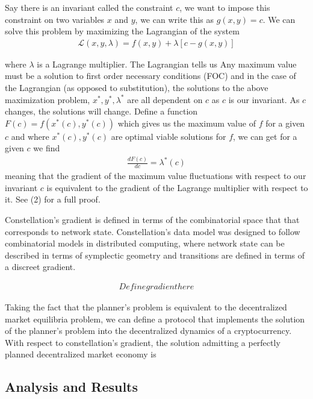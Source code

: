 \documentclass{article}
\begin{document}
Say there is an invariant called the constraint $c$, we want to impose this constraint on two variables $x$ and $y$, we can write this as $g(x, y) = c$. We can solve this problem by maximizing the Lagrangian of the system
\begin{equation} \label{eq1}
\begin{split}
\mathcal{L}(x, y, \lambda) = f(x, y) + \lambda [c - g(x,y)]
\end{split}
\end{equation}

where $\lambda$ is a Lagrange multiplier. The Lagrangian tells us Any maximum value must be a solution to first order necessary conditions (FOC) and in the case of the Lagrangian (as opposed to substitution), the solutions to the above maximization problem, $x^*, y^*, \lambda^*$ are all dependent on $c$ as $c$ is our invariant. As $c$ changes, the solutions will change. Define a function $F(c) = f(x^*(c), y^*(c))$ which gives us the maximum value of $f$ for a given $c$ and where $x^*(c), y^*(c)$ are optimal viable solutions for $f$, we can get for a given $c$ we find
\begin{equation} \label{eq1}
\begin{split}
\frac{dF(c)}{dc} = \lambda^*(c) 
\end{split}
\end{equation}
meaning that the gradient of the maximum value fluctuations with respect to our invariant $c$ is equivalent to the gradient of the Lagrange multiplier with respect to it. See (2) for a full proof.

Constellation's gradient is defined in terms of the combinatorial space that that corresponds to network state. Constellation's data model was designed to follow combinatorial models in distributed computing, where network state can be described in terms of symplectic geometry and transitions are defined in terms of a discreet gradient.

\begin{equation} \label{eq1}
\begin{split}
Define gradient here
\end{split}
\end{equation}

Taking the fact that the planner's problem is equivalent to the decentralized market equilibria problem, we can define a protocol that implements the solution of the planner's problem into the decentralized dynamics of a cryptocurrency. With respect to constellation's gradient, the solution admitting a perfectly planned decentralized market economy is


\subsection{Analysis and Results}



\end{document}
